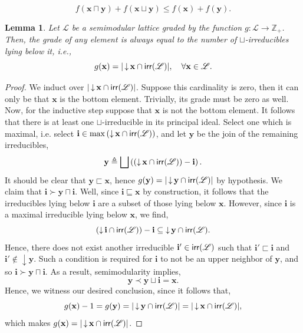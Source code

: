 \documentclass[11pt]{article}
\newtheorem{lemma}[theorem]{Lemma}
\newcommand{\irr}{\mathop{\textsf{\textup{irr}}}}
\newcommand{\ideal}[1]{\mathop{\downarrow}#1}
\providecommand{\L}{}
\renewcommand{\L}{\mathscr{L}}
\begin{document}
\begin{equation}\label{eq:submodular}
    f(\mathbf{x} \sqcap \mathbf{y}) + f(\mathbf{x} \sqcup \mathbf{y}) \leq f(\mathbf{x}) + f(\mathbf{y}).
\end{equation}
\iffalse
\begin{lemma}\label{lem:semimod-irr-grade}
    Let $\L$ be a semimodular lattice graded by the function $g: \L\to\mathbb{Z}_+$.
    Then, the grade of any element is always equal to the number of $\sqcup$-irreducibles lying below it, i.e.,
    \[
        g(\mathbf{x}) = |\ideal\mathbf{x} \cap \irr(\L)|,\quad\forall\mathbf{x} \in \L.
    \]
\end{lemma}
\begin{proof}
    We induct over $|\ideal\mathbf{x} \cap \irr(\L)|$.
    Suppose this cardinality is zero, then it can only be that $\mathbf{x}$ is the bottom element.
    Trivially, its grade must be zero as well.
    Now, for the inductive step suppose that $\mathbf{x}$ is not the bottom element.
    It follows that there is at least one $\sqcup$-irreducible in its principal ideal.
    Select one which is maximal, i.e. select $\mathbf{i} \in \max \left(\ideal\mathbf{x} \cap \irr(\L)\right)$, and let $\mathbf{y}$ be the join of the remaining irreducibles,
    \[
        \mathbf{y} \triangleq \bigsqcup \left((\ideal\mathbf{x}\cap \irr(\L)) - \mathbf{i}\right).
    \]
    It should be clear that $\mathbf{y} \sqsubset \mathbf{x}$, hence $g(\mathbf{y}) = |\ideal\mathbf{y} \cap \irr(\L)|$ by hypothesis.
    We claim that $\mathbf{i} \succ \mathbf{y}\sqcap\mathbf{i}$.
    Well, since $\mathbf{i} \sqsubseteq \mathbf{x}$ by construction, it follows that the irreducibles lying below $\mathbf{i}$ are a subset of those lying below $\mathbf{x}$.
    However, since $\mathbf{i}$ is a maximal irreducible lying below $\mathbf{x}$, we find,
    \[
        \left(\ideal\mathbf{i} \cap \irr(\L)\right) - \mathbf{i} \subseteq \ideal\mathbf{y} \cap \irr(\L).
    \]
    Hence, there does not exist another irreducible $\mathbf{i}' \in \irr(\L)$ such that $\mathbf{i}'\sqsubset \mathbf{i}$ and $\mathbf{i}' \notin \ideal\mathbf{y}$.
    Such a condition is required for $\mathbf{i}$ to not be an upper neighbor of $\mathbf{y}$, and so $\mathbf{i}\succ \mathbf{y}\sqcap\mathbf{i}$.
    As a result, semimodularity implies,
    \[
        \mathbf{y} \prec \mathbf{y} \sqcup \mathbf{i} = \mathbf{x}.
    \]
    Hence, we witness our desired conclusion, since it follows that,
    \[
        g(\mathbf{x}) - 1 = g(\mathbf{y}) = |\ideal \mathbf{y} \cap \irr(\L)| = |\ideal \mathbf{x} \cap \irr(\L)|,
    \]
    which makes $g(\mathbf{x}) = |\ideal \mathbf{x} \cap \irr(\L)|$.
\end{proof}
\end{document}
